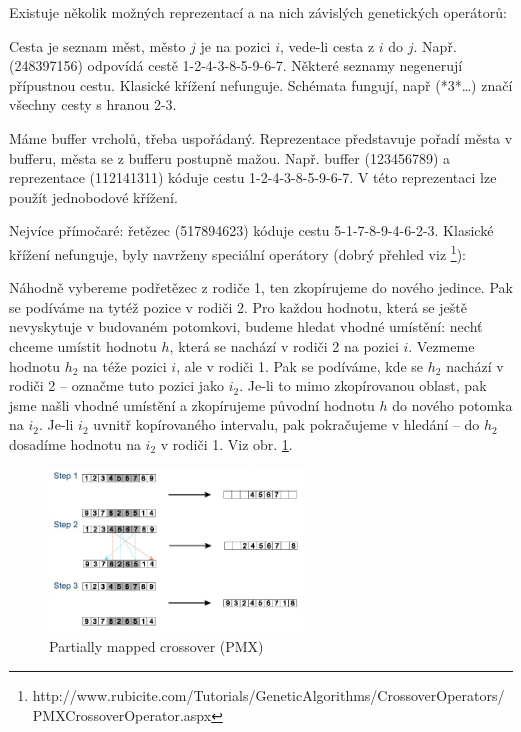 Existuje několik možných reprezentací a na nich závislých genetických operátorů:
\begin{description}
	\leftskip 40pt
	\setlength{\itemsep}{0pt}
	\item[reprezentace sousednosti:] Cesta je seznam měst, město $j$ je na pozici $i$, vede-li cesta z $i$ do $j$. Např. (248397156) odpovídá cestě 1-2-4-3-8-5-9-6-7. Některé seznamy negenerují přípustnou cestu. Klasické křížení nefunguje. Schémata fungují, např (*3*\dots) značí všechny cesty s hranou 2-3.
	\item[reprezentace bufferem] Máme buffer vrcholů, třeba uspořádaný. Reprezentace představuje pořadí města v bufferu, města se z bufferu postupně mažou. Např. buffer (123456789) a reprezentace (112141311) kóduje cestu 1-2-4-3-8-5-9-6-7. V této reprezentaci lze použít jednobodové křížení.
	\item[reprezentace permutací] Nejvíce přímočaré: řetězec (517894623) kóduje cestu 5-1-7-8-9-4-6-2-3. Klasické křížení nefunguje, byly navrženy speciální operátory (dobrý přehled viz \footnote{http://www.rubicite.com/Tutorials/GeneticAlgorithms/CrossoverOperators/PMXCrossoverOperator.aspx}):
	\begin{description}
		\leftskip 30pt
		\setlength{\itemsep}{0pt}
		\item[PMX (partially mapped crossover] Náhodně vybereme podřetězec z rodiče 1, ten zkopírujeme do nového jedince. Pak se podíváme na tytéž pozice v rodiči 2. Pro každou hodnotu, která se ještě nevyskytuje v budovaném potomkovi, budeme hledat vhodné umístění: nechť chceme umístit hodnotu $h$, která se nachází v rodiči 2 na pozici $i$. Vezmeme hodnotu $h_2$ na téže pozici $i$, ale v rodiči 1. Pak se podíváme, kde se $h_2$ nachází v rodiči 2 -- označme tuto pozici jako $i_2$. Je-li to mimo zkopírovanou oblast, pak jsme našli vhodné umístění a zkopírujeme původní hodnotu $h$ do nového potomka na $i_2$. Je-li $i_2$ uvnitř kopírovaného intervalu, pak pokračujeme v hledání -- do $h_2$ dosadíme hodnotu na $i_2$ v rodiči 1. Viz obr. \ref{pmx}.
		\begin{figure}[H]
			\centering			
			\includegraphics[width=0.6\textwidth]{img/pmx.png}
			\caption{Partially mapped crossover (PMX)}
			\label{pmx}
			

\end{figure}
\end{description}
\end{description}

